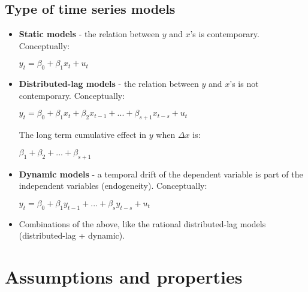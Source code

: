 \documentclass[10pt, a4paper, landscape]{extarticle}
\begin{document}
\begin{multicols}{3}
	\subsection*{Type of time series models}
		\begin{itemize}[leftmargin=*]
			\item \textbf{Static models} - the relation between $y$ and $x$'s is contemporary. Conceptually:
			\begin{center}
				$y_t = \beta_0 + \beta_1 x_t + u_t$
			\end{center}
			\item \textbf{Distributed-lag models} - the relation between $y$ and $x$'s is not contemporary. Conceptually:
			\begin{center}
				$y_t = \beta_0 + \beta_1 x_t + \beta_2 x_{t-1} + ... + \beta_{s+1} x_{t-s} + u_t$
			\end{center}
			The long term cumulative effect in $y$ when $\Delta x$ is:
			\begin{center}
			 	$\beta_1 + \beta_2 + ... + \beta_{s+1}$
			\end{center}
		 	\item \textbf{Dynamic models} - a temporal drift of the dependent variable is part of the independent variables (endogeneity). Conceptually:
		 	\begin{center}
		 		$y_t = \beta_0 + \beta_1 y_{t-1} + ... + \beta_s y_{t-s} + u_t$
		 	\end{center}
	 		\item Combinations of the above, like the rational distributed-lag models (distributed-lag + dynamic).
		\end{itemize}

\columnbreak

\section*{Assumptions and properties}

\end{multicols}
\end{document}

